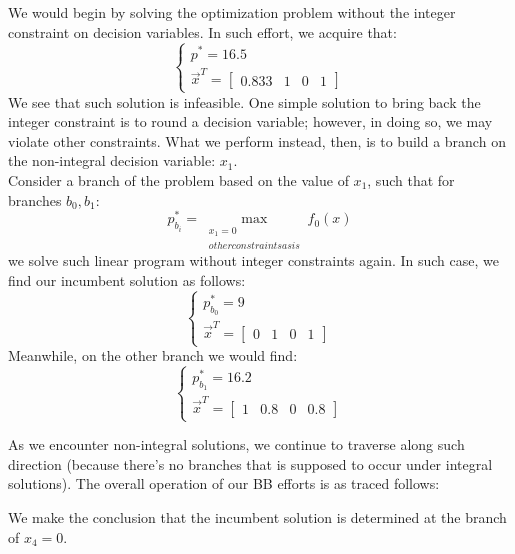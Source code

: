 We would begin by solving the optimization problem without the integer constraint on decision variables.
In such effort, we acquire that:
\[
    \begin{cases}
        p^* = 16.5 \\
        \vec{x}^T = \begin{bmatrix} 0.833 & 1 & 0 & 1 \end{bmatrix}
    \end{cases}
\]
We see that such solution is infeasible.
One simple solution to bring back the integer constraint is to round a decision variable; however, in doing so, we may violate other constraints.
What we perform instead, then, is to build a branch on the non-integral decision variable: $x_1$. \\
Consider a branch of the problem based on the value of $x_1$, such that for branches $b_0, b_1$:
\[
    p_{b_i}^* = \max_{
        \substack{
            x_1 = 0 \\
            other constraints as is
        }
    } f_0(x)
\]
we solve such linear program without integer constraints again.
In such case, we find our incumbent solution as follows:
\[
    \begin{cases}
        p_{b_0}^* = 9 \\
        \vec{x}^T = \begin{bmatrix} 0 & 1 & 0 & 1 \end{bmatrix}
    \end{cases}
\]
Meanwhile, on the other branch we would find:
\[
    \begin{cases}
        p_{b_1}^* = 16.2 \\
        \vec{x}^T = \begin{bmatrix} 1 & 0.8 & 0 & 0.8 \end{bmatrix}
    \end{cases}
\]

As we encounter non-integral solutions, we continue to traverse along such direction (because there's no branches that is supposed to occur under integral solutions).
The overall operation of our BB efforts is as traced follows:
\begin{center}
\end{center}
We make the conclusion that the incumbent solution is determined at the branch of $x_4 = 0$.

